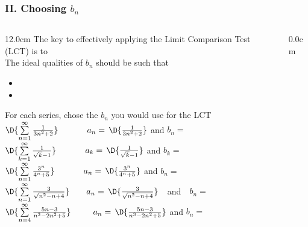 \begin{frame}
\frametitle{II. Choosing $b_n$}
\scriptsize
\begin{columns}
\begin{column}{12.0cm}
	The key to effectively applying the Limit Comparison Test (LCT) is to  \\
	\vspace{0.2cm}
	The ideal qualities of $b_n$ should be such that
	\begin{itemize}
		\item {}
		\item {}
	\end{itemize}
	For each series, chose the $b_n$ you would use for the LCT \\
	\vspace{0.1cm}
	$\D{\sum \limits_{n=1}^{\infty} \frac{1}{3n^2 + 2}} \,\, \qquad $  \,\, $a_n = \, \D{ \frac{1}{3n^2 + 2}}$ \quad and \quad $b_n = $  \\
	\vspace{0.2cm}
	$\D{\sum \limits_{k=1}^{\infty} \frac{1}{\sqrt{k} - 1}} \,\, \qquad $ \,\, $a_k = \, \D{ \frac{1}{\sqrt{k} - 1}}$ \quad and \quad $b_k = $  \\
	\vspace{0.2cm}
	$\D{\sum \limits_{n=1}^{\infty} \frac{3^n}{4^n + 5}} \,\, \qquad $ \,\, $a_n = \, \D{ \frac{3^n}{4^n + 5}}$ \quad and \quad $b_n = $  \\
	\vspace{0.2cm}
	$\D{\sum \limits_{n=1}^{\infty} \frac{3}{\sqrt{n^2 - n + 4}}} \qquad a_n = \, \D{ \frac{3}{\sqrt{n^2 - n + 4}}}$ \,\, and \,\, $b_n = $  \\
	\vspace{0.2cm}
	$\D{\sum \limits_{n=4}^{\infty} \frac{5n-3}{n^3 - 2n^2 + 5}} \,\, \qquad  \,\, a_n = \, \D{ \frac{5n-3}{n^3 - 2n^2 + 5}}$ \quad and \quad $b_n = $  \\
\end{column}
\begin{column}{0.0cm}\end{column}
\end{columns}
\end{frame}

